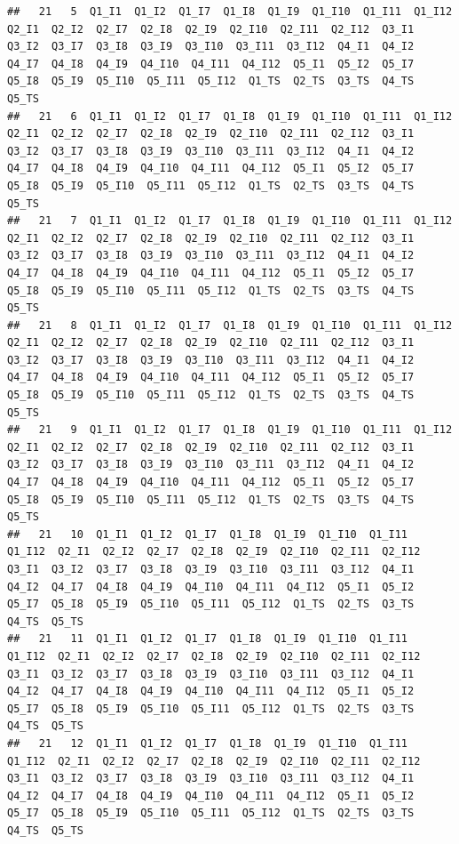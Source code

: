 \documentclass[]{book}
\begin{document}
\begin{verbatim}
##   21   5  Q1_I1  Q1_I2  Q1_I7  Q1_I8  Q1_I9  Q1_I10  Q1_I11  Q1_I12  Q2_I1  Q2_I2  Q2_I7  Q2_I8  Q2_I9  Q2_I10  Q2_I11  Q2_I12  Q3_I1  Q3_I2  Q3_I7  Q3_I8  Q3_I9  Q3_I10  Q3_I11  Q3_I12  Q4_I1  Q4_I2  Q4_I7  Q4_I8  Q4_I9  Q4_I10  Q4_I11  Q4_I12  Q5_I1  Q5_I2  Q5_I7  Q5_I8  Q5_I9  Q5_I10  Q5_I11  Q5_I12  Q1_TS  Q2_TS  Q3_TS  Q4_TS  Q5_TS
##   21   6  Q1_I1  Q1_I2  Q1_I7  Q1_I8  Q1_I9  Q1_I10  Q1_I11  Q1_I12  Q2_I1  Q2_I2  Q2_I7  Q2_I8  Q2_I9  Q2_I10  Q2_I11  Q2_I12  Q3_I1  Q3_I2  Q3_I7  Q3_I8  Q3_I9  Q3_I10  Q3_I11  Q3_I12  Q4_I1  Q4_I2  Q4_I7  Q4_I8  Q4_I9  Q4_I10  Q4_I11  Q4_I12  Q5_I1  Q5_I2  Q5_I7  Q5_I8  Q5_I9  Q5_I10  Q5_I11  Q5_I12  Q1_TS  Q2_TS  Q3_TS  Q4_TS  Q5_TS
##   21   7  Q1_I1  Q1_I2  Q1_I7  Q1_I8  Q1_I9  Q1_I10  Q1_I11  Q1_I12  Q2_I1  Q2_I2  Q2_I7  Q2_I8  Q2_I9  Q2_I10  Q2_I11  Q2_I12  Q3_I1  Q3_I2  Q3_I7  Q3_I8  Q3_I9  Q3_I10  Q3_I11  Q3_I12  Q4_I1  Q4_I2  Q4_I7  Q4_I8  Q4_I9  Q4_I10  Q4_I11  Q4_I12  Q5_I1  Q5_I2  Q5_I7  Q5_I8  Q5_I9  Q5_I10  Q5_I11  Q5_I12  Q1_TS  Q2_TS  Q3_TS  Q4_TS  Q5_TS
##   21   8  Q1_I1  Q1_I2  Q1_I7  Q1_I8  Q1_I9  Q1_I10  Q1_I11  Q1_I12  Q2_I1  Q2_I2  Q2_I7  Q2_I8  Q2_I9  Q2_I10  Q2_I11  Q2_I12  Q3_I1  Q3_I2  Q3_I7  Q3_I8  Q3_I9  Q3_I10  Q3_I11  Q3_I12  Q4_I1  Q4_I2  Q4_I7  Q4_I8  Q4_I9  Q4_I10  Q4_I11  Q4_I12  Q5_I1  Q5_I2  Q5_I7  Q5_I8  Q5_I9  Q5_I10  Q5_I11  Q5_I12  Q1_TS  Q2_TS  Q3_TS  Q4_TS  Q5_TS
##   21   9  Q1_I1  Q1_I2  Q1_I7  Q1_I8  Q1_I9  Q1_I10  Q1_I11  Q1_I12  Q2_I1  Q2_I2  Q2_I7  Q2_I8  Q2_I9  Q2_I10  Q2_I11  Q2_I12  Q3_I1  Q3_I2  Q3_I7  Q3_I8  Q3_I9  Q3_I10  Q3_I11  Q3_I12  Q4_I1  Q4_I2  Q4_I7  Q4_I8  Q4_I9  Q4_I10  Q4_I11  Q4_I12  Q5_I1  Q5_I2  Q5_I7  Q5_I8  Q5_I9  Q5_I10  Q5_I11  Q5_I12  Q1_TS  Q2_TS  Q3_TS  Q4_TS  Q5_TS
##   21   10  Q1_I1  Q1_I2  Q1_I7  Q1_I8  Q1_I9  Q1_I10  Q1_I11  Q1_I12  Q2_I1  Q2_I2  Q2_I7  Q2_I8  Q2_I9  Q2_I10  Q2_I11  Q2_I12  Q3_I1  Q3_I2  Q3_I7  Q3_I8  Q3_I9  Q3_I10  Q3_I11  Q3_I12  Q4_I1  Q4_I2  Q4_I7  Q4_I8  Q4_I9  Q4_I10  Q4_I11  Q4_I12  Q5_I1  Q5_I2  Q5_I7  Q5_I8  Q5_I9  Q5_I10  Q5_I11  Q5_I12  Q1_TS  Q2_TS  Q3_TS  Q4_TS  Q5_TS
##   21   11  Q1_I1  Q1_I2  Q1_I7  Q1_I8  Q1_I9  Q1_I10  Q1_I11  Q1_I12  Q2_I1  Q2_I2  Q2_I7  Q2_I8  Q2_I9  Q2_I10  Q2_I11  Q2_I12  Q3_I1  Q3_I2  Q3_I7  Q3_I8  Q3_I9  Q3_I10  Q3_I11  Q3_I12  Q4_I1  Q4_I2  Q4_I7  Q4_I8  Q4_I9  Q4_I10  Q4_I11  Q4_I12  Q5_I1  Q5_I2  Q5_I7  Q5_I8  Q5_I9  Q5_I10  Q5_I11  Q5_I12  Q1_TS  Q2_TS  Q3_TS  Q4_TS  Q5_TS
##   21   12  Q1_I1  Q1_I2  Q1_I7  Q1_I8  Q1_I9  Q1_I10  Q1_I11  Q1_I12  Q2_I1  Q2_I2  Q2_I7  Q2_I8  Q2_I9  Q2_I10  Q2_I11  Q2_I12  Q3_I1  Q3_I2  Q3_I7  Q3_I8  Q3_I9  Q3_I10  Q3_I11  Q3_I12  Q4_I1  Q4_I2  Q4_I7  Q4_I8  Q4_I9  Q4_I10  Q4_I11  Q4_I12  Q5_I1  Q5_I2  Q5_I7  Q5_I8  Q5_I9  Q5_I10  Q5_I11  Q5_I12  Q1_TS  Q2_TS  Q3_TS  Q4_TS  Q5_TS

\end{verbatim}
\end{document}

